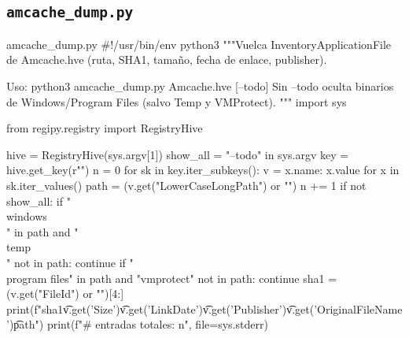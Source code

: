 \documentclass[11pt,a4paper]{article}
\begin{document}
\subsection{\texttt{amcache\_dump.py}}
\begin{codigopython}{amcache\_dump.py}
#!/usr/bin/env python3
"""Vuelca InventoryApplicationFile de Amcache.hve (ruta, SHA1, tamaño, fecha de enlace, publisher).

Uso: python3 amcache_dump.py Amcache.hve [--todo]
Sin --todo oculta binarios de Windows/Program Files (salvo Temp y VMProtect).
"""
import sys

from regipy.registry import RegistryHive

hive = RegistryHive(sys.argv[1])
show_all = "--todo" in sys.argv
key = hive.get_key(r"\Root\InventoryApplicationFile")
n = 0
for sk in key.iter_subkeys():
    v = {x.name: x.value for x in sk.iter_values()}
    path = (v.get("LowerCaseLongPath") or "")
    n += 1
    if not show_all:
        if "\\windows\\" in path and "\\temp\\" not in path:
            continue
        if "\\program files" in path and "vmprotect" not in path:
            continue
    sha1 = (v.get("FileId") or "")[4:]
    print(f"{sha1}\t{v.get('Size')}\t{v.get('LinkDate')}\t{v.get('Publisher')}\t{v.get('OriginalFileName')}\t{path}")
print(f"# entradas totales: {n}", file=sys.stderr)
\end{codigopython}
\end{document}
